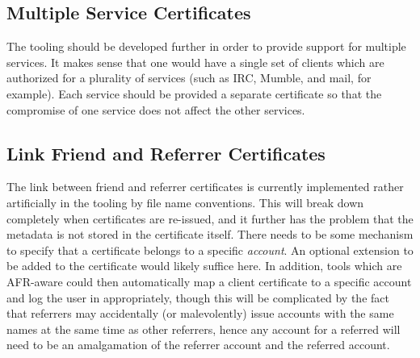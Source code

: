 \documentclass{article}
\begin{document}
\subsection{Multiple Service Certificates}

The tooling should be developed further in order to provide support for multiple services.  It makes sense that one would have a single set of clients which are authorized for a plurality of services (such as IRC, Mumble, and mail, for example).  Each service should be provided a separate certificate so that the compromise of one service does not affect the other services.

\subsection{Link Friend and Referrer Certificates}

The link between friend and referrer certificates is currently implemented rather artificially in the tooling by file name conventions.  This will break down completely when certificates are re-issued, and it further has the problem that the metadata is not stored in the certificate itself.  There needs to be some mechanism to specify that a certificate belongs to a specific \emph{account}.  An optional extension to be added to the certificate would likely suffice here.  In addition, tools which are AFR-aware could then automatically map a client certificate to a specific account and log the user in appropriately, though this will be complicated by the fact that referrers may accidentally (or malevolently) issue accounts with the same names at the same time as other referrers, hence any account for a referred will need to be an amalgamation of the referrer account and the referred account.
\end{document}
